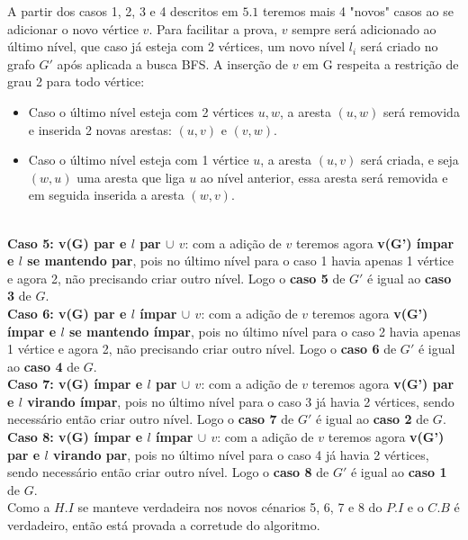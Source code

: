 \documentclass[12pt]{article}
\begin{document}
A partir dos casos 1, 2, 3 e 4 descritos em $5.1$ teremos mais 4 "novos" casos ao se adicionar o novo vértice $v$. Para facilitar a prova, $v$ sempre será adicionado ao último nível, que caso já esteja com 2 vértices, um novo nível $l_i$ será criado no grafo $G'$ após aplicada a busca BFS. A inserção de $v$ em G respeita a restrição de grau 2 para todo vértice:
\begin{itemize}
    \item Caso o último nível esteja com 2 vértices $u,w$, a aresta $(u,w)$ será removida e inserida 2 novas arestas: $(u,v)$ e $(v,w)$.
    \item Caso o último nível esteja com 1 vértice $u$, a aresta $(u,v)$ será criada, e seja $(w,u)$ uma aresta que liga $u$ ao nível anterior, essa aresta será removida e em seguida inserida a aresta $(w,v)$.
    
\end{itemize}\\

\textbf{Caso 5: v(G) par e $l$ par $\cup$ $v$}: com a adição de $v$ teremos agora \textbf{v(G') ímpar e $l$ se mantendo par}, pois no último nível para o caso 1 havia apenas 1 vértice e agora 2, não precisando criar outro nível. Logo o \textbf{caso 5} de $G'$ é igual ao \textbf{caso 3} de $G$. \\

\textbf{Caso 6: v(G) par e $l$ ímpar $\cup$ $v$}: com a adição de $v$ teremos agora \textbf{ v(G') ímpar e $l$ se mantendo ímpar}, pois no último nível para o caso 2 havia apenas 1 vértice e agora 2, não precisando criar outro nível. Logo o \textbf{caso 6} de $G'$ é igual ao \textbf{caso 4} de $G$. \\

\textbf{Caso 7: v(G) ímpar e $l$ par $\cup$ $v$}: com a adição de $v$ teremos agora \textbf{ v(G') par e $l$ virando ímpar}, pois no último nível para o caso 3 já havia 2 vértices, sendo necessário então criar outro nível. Logo o \textbf{caso 7} de $G'$ é igual ao \textbf{caso 2} de $G$. \\

\textbf{Caso 8: v(G) ímpar e $l$ ímpar $\cup$ $v$}: com a adição de $v$ teremos agora \textbf{ v(G') par e $l$ virando par}, pois no último nível para o caso 4 já havia 2 vértices, sendo necessário então criar outro nível. Logo o \textbf{caso 8} de $G'$ é igual ao \textbf{caso 1} de $G$. \\

Como a $H.I$ se manteve verdadeira nos novos cénarios 5, 6, 7 e 8 do $P.I$ e o $C.B$ é verdadeiro, então está provada a corretude do algoritmo. 
\end{document}
